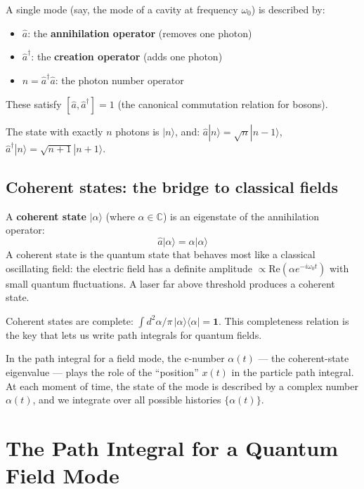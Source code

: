 \documentclass[12pt]{article}
\newcommand{\bra}[1]{\langle #1 |}
\newcommand{\ket}[1]{| #1 \rangle}
\begin{document}
A single mode (say, the mode of a cavity at frequency $\omega_0$) is
described by:
\begin{itemize}
  \item $\hat{a}$: the \textbf{annihilation operator} (removes one photon)
  \item $\hat{a}^\dagger$: the \textbf{creation operator} (adds one photon)
  \item $\hat{n} = \hat{a}^\dagger\hat{a}$: the photon number operator
\end{itemize}
These satisfy $[\hat{a}, \hat{a}^\dagger] = 1$ (the canonical
commutation relation for bosons).

The state with exactly $n$ photons is $\ket{n}$, and:
$\hat{a}\ket{n} = \sqrt{n}\ket{n-1}$,
$\hat{a}^\dagger\ket{n} = \sqrt{n+1}\ket{n+1}$.

\subsection{Coherent states: the bridge to classical fields}

A \textbf{coherent state} $\ket{\alpha}$ (where $\alpha\in\mathbb{C}$)
is an eigenstate of the annihilation operator:
\begin{equation}
  \hat{a}\ket{\alpha} = \alpha\ket{\alpha}
\end{equation}
A coherent state is the quantum state that behaves most like a
classical oscillating field: the electric field has a definite
amplitude $\propto\mathrm{Re}(\alpha e^{-i\omega_0 t})$ with small
quantum fluctuations. A laser far above threshold produces a coherent state.

Coherent states are complete: $\int d^2\alpha/\pi\,\ket{\alpha}\bra{\alpha} = \mathbf{1}$.
This completeness relation is the key that lets us write path integrals
for quantum fields.

\begin{idea}
In the path integral for a field mode, the c-number $\alpha(t)$
--- the coherent-state eigenvalue --- plays the role of the
``position'' $x(t)$ in the particle path integral. At each
moment of time, the state of the mode is described by a complex
number $\alpha(t)$, and we integrate over all possible histories
$\{\alpha(t)\}$.
\end{idea}

\section{The Path Integral for a Quantum Field Mode}
\end{document}
